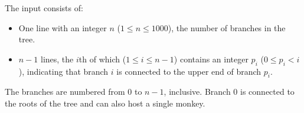 
    The input consists of:
    \begin{itemize}
        \item One line with an integer $n$ ($1\leq n\leq 1000$), the number of
    branches in the tree.
        \item $n-1$ lines, the $i$th of which ($1\leq i\leq n-1$) contains an integer $p_i$ ($0\leq p_i<i$),
            indicating that branch $i$ is connected to the upper end of branch $p_i$.
    \end{itemize}
    The branches are numbered from $0$ to $n-1$, inclusive. Branch $0$ is
    connected to the roots of the tree and can also host a single monkey.
